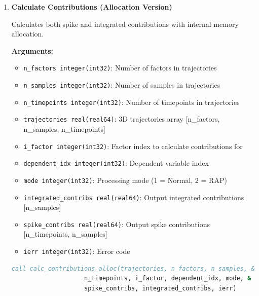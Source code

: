 \documentclass[11pt]{article}
\begin{document}
\begin{enumerate}
\begin{enumerate}
	      	\item \textbf{Calculate Contributions (Allocation Version)}
	      	      
	      	      Calculates both spike and integrated contributions with internal memory
	      	      allocation.
	      	      
	      	      \textbf{Arguments:}
	      	      \begin{itemize}
	      	      	\item \texttt{n\_factors integer(int32)}: Number of factors in trajectories
	      	      	      
	      	      	\item \texttt{n\_samples integer(int32)}: Number of samples in trajectories
	      	      	      
	      	      	\item \texttt{n\_timepoints integer(int32)}: Number of timepoints in
	      	      	      trajectories
	      	      	      
	      	      	\item \texttt{trajectories real(real64)}: 3D trajectories array [n\_factors,
	      	      	n\_samples, n\_timepoints]
	      	      	
	      	      	\item \texttt{i\_factor integer(int32)}: Factor index to calculate contributions
	      	      	      for
	      	      	      
	      	      	\item \texttt{dependent\_idx integer(int32)}: Dependent variable index
	      	      	      
	      	      	\item \texttt{mode integer(int32)}: Processing mode (1 = Normal, 2 =
	      	      	      RAP)
	      	      	      
	      	      	\item \texttt{integrated\_contribs real(real64)}: Output integrated contributions
	      	      	      [n\_samples]
	      	      	      
	      	      	\item \texttt{spike\_contribs real(real64)}: Output spike contributions
	      	      	      [n\_timepoints, n\_samples]
	      	      	      
	      	      	\item \texttt{ierr integer(int32)}: Error code
	      	      \end{itemize}
	      	      \begin{lstlisting}[language=Fortran, caption={Allocation-Based Contributions Calculation}]
call calc_contributions_alloc(trajectories, n_factors, n_samples, &
                    n_timepoints, i_factor, dependent_idx, mode, &
                    spike_contribs, integrated_contribs, ierr)
	      	      \end{lstlisting}
	      	      

\end{enumerate}
\end{enumerate}
\end{document}
